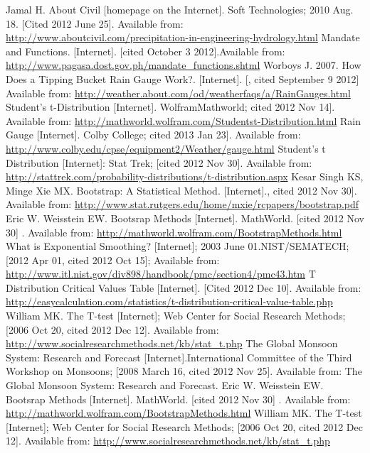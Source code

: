 \documentclass{pshscarc2013}
\begin{document}
\begin{thebibliography}{99\kern\bibindent}
 Jamal H. About Civil [homepage on the Internet]. Soft Technologies; 2010 Aug. 18. [Cited 2012 June 25]. Available from: \url{http://www.aboutcivil.com/precipitation-in-engineering-hydrology.html}
 Mandate and Functions. [Internet]. [cited October 3 2012].Available from:  \url{http://www.pagasa.dost.gov.ph/mandate_functions.shtml}
 Worboys J. 2007. How Does a Tipping Bucket Rain Gauge Work?. [Internet]. [, cited September 9 2012] Available from: \url{ http://weather.about.com/od/weatherfaqs/a/RainGauges.html}
 Student's t-Distribution [Internet]. WolframMathworld; cited 2012 Nov 14]. Available from: \url{http://mathworld.wolfram.com/Studentst-Distribution.html}
 Rain Gauge [Internet]. Colby College; cited 2013 Jan 23]. Available from: \url{ http://www.colby.edu/cpse/equipment2/Weather/gauge.html}
 Student's t Distribution [Internet]: Stat Trek; [cited 2012 Nov 30]. Available from: \url{ http://stattrek.com/probability-distributions/t-distribution.aspx}
 Kesar Singh KS, Minge Xie MX.  Bootstrap: A Statistical Method. [Internet]., cited 2012 Nov 30]. Available from: \url{ http://www.stat.rutgers.edu/home/mxie/rcpapers/bootstrap.pdf}
\bibitem Eric W. Weisstein EW. Bootsrap Methods [Internet]. MathWorld. [cited 2012 Nov 30] . Available from: \url{http://mathworld.wolfram.com/BootstrapMethods.html}
 What is Exponential Smoothing? [Internet]; 2003 June 01.NIST/SEMATECH; [2012 Apr 01, cited 2012 Oct 15]; Available from: \url{ http://www.itl.nist.gov/div898/handbook/pmc/section4/pmc43.htm}
 T Distribution Critical Values Table [Internet]. [Cited 2012 Dec 10]. Available from: \url{http://easycalculation.com/statistics/t-distribution-critical-value-table.php}
 William MK. The T-test [Internet]; Web Center for Social Research Methods; [2006 Oct 20, cited 2012 Dec 12]. Available from: \url{ http://www.socialresearchmethods.net/kb/stat_t.php}
 The Global Monsoon System: Research and Forecast [Internet].International Committee of the Third Workshop on Monsoons; [2008 March 16, cited 2012 Nov 25]. Available from: The Global Monsoon System: Research and Forecast.	
 Eric W. Weisstein EW. Bootsrap Methods [Internet]. MathWorld. [cited 2012 Nov 30] . Available from:  \url{http://mathworld.wolfram.com/BootstrapMethods.html}
 William MK. The T-test [Internet]; Web Center for Social Research Methods; [2006 Oct 20, cited 2012 Dec 12]. Available from: \url{http://www.socialresearchmethods.net/kb/stat_t.php}


\end{thebibliography}
\end{document}
